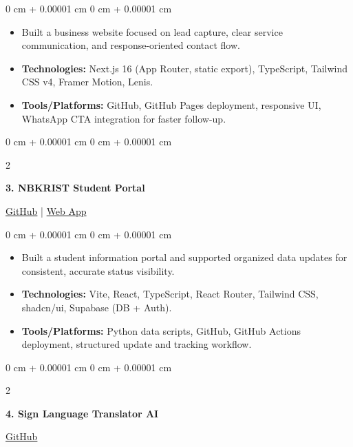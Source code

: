 \documentclass[10pt, a4paper]{article}
\newenvironment{highlights}{
    \begin{itemize}[
        topsep=0.06 cm,
        parsep=0.04 cm,
        partopsep=0pt,
        itemsep=0.02 cm,
        leftmargin=0 cm + 10pt
    ]
}{
    \end{itemize}
}
\newenvironment{onecolentry}{
    \begin{adjustwidth}{
        0 cm + 0.00001 cm
    }{
        0 cm + 0.00001 cm
    }
}{
    \end{adjustwidth}
}
\newenvironment{twocolentry}[2][4.5 cm]{
    \onecolentry
    \def\secondColumn{#2}
    \setcolumnwidth{\fill, #1}
    \begin{paracol}{2}
}{
    \switchcolumn \raggedleft \secondColumn
    \end{paracol}
    \endonecolentry
}
\begin{document}
    \vspace{0.2 cm}
    \begin{onecolentry}
        \begin{highlights}
            \item Built a business website focused on lead capture, clear service communication, and response-oriented contact flow.
            \item \textbf{Technologies:} Next.js 16 (App Router, static export), TypeScript, Tailwind CSS v4, Framer Motion, Lenis.
            \item \textbf{Tools/Platforms:} GitHub, GitHub Pages deployment, responsive UI, WhatsApp CTA integration for faster follow-up.
        \end{highlights}
    \end{onecolentry}

    \vspace{0.2 cm}

    \begin{twocolentry}{
        \href{https://github.com/nrenx/nbkrist-student-portal}{GitHub} | \href{https://nbkrstudenthub.me/}{Web App}
    }
        \textbf{3. NBKRIST Student Portal}
    \end{twocolentry}

    \vspace{0.2 cm}
    \begin{onecolentry}
        \begin{highlights}
            \item Built a student information portal and supported organized data updates for consistent, accurate status visibility.
            \item \textbf{Technologies:} Vite, React, TypeScript, React Router, Tailwind CSS, shadcn/ui, Supabase (DB + Auth).
            \item \textbf{Tools/Platforms:} Python data scripts, GitHub, GitHub Actions deployment, structured update and tracking workflow.
        \end{highlights}
    \end{onecolentry}

    \vspace{0.2 cm}
    \begin{twocolentry}{
        \href{https://github.com/nrenx/Sign-Language-Translator_using_AI-ML}{GitHub}
    }
        \textbf{4. Sign Language Translator AI}
    \end{twocolentry}
\end{document}
